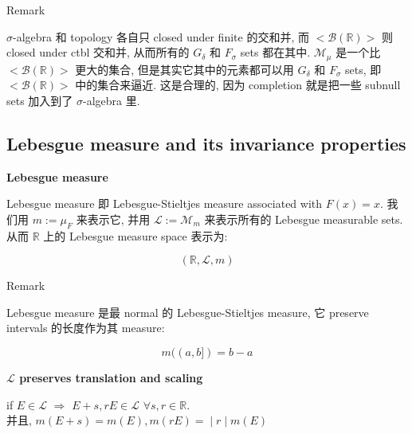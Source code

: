 \documentclass{qlnotes-export}
\begin{document}
\begin{qlremark}{Remark}

\(\sigma\)-algebra 和 topology 各自只 closed under finite 的交和并, 而 \(< \mathcal{B}({\mathbb{R}}) >\) 则 closed under ctbl 交和并, 从而所有的 \(G_{\delta}\) 和 \(F_{\sigma}\) sets 都在其中. \(\mathcal{M}_{\mu}\) 是一个比 \(< \mathcal{B}({\mathbb{R}}) >\) 更大的集合, 但是其实它其中的元素都可以用 \(G_{\delta}\) 和 \(F_{\sigma}\) sets, 即 \(< \mathcal{B}({\mathbb{R}}) >\) 中的集合来逼近. 这是合理的, 因为 completion 就是把一些 subnull sets 加入到了 \(\sigma\)-algebra 里.

\end{qlremark}

\subsection{Lebesgue measure and its invariance properties}\label{lebesgue-measure-and-its-invariance-properties}

\begin{definition}{\protect{}\label{kn-lebesgue-measure}{\textbf{Lebesgue
measure}}}

Lebesgue measure 即 Lebesgue-Stieltjes measure associated with \(F(x) = x\). 我们用 \(m := \mu_{F}\) 来表示它, 并用 \(\mathcal{L} := \mathcal{M}_{m}\) 来表示所有的 Lebesgue measurable sets.\\
从而 \(\mathbb{R}\) 上的 Lebesgue measure space 表示为:

\[({\mathbb{R}},\mathcal{L},m)\]

\end{definition}

\begin{qlremark}{Remark}

Lebesgue measure 是最 normal 的 Lebesgue-Stieltjes measure, 它 preserve intervals 的长度作为其 measure:

\[m((a,b\rbrack) = b - a\]

\end{qlremark}

\begin{theorem}{\protect{}\label{kn-mathcal-l-preserves-translation-and-scaling}{\textbf{\(\mathcal{L}\)
preserves translation and scaling}}}

if \(E \in \mathcal{L}\) \(\Rightarrow\) \(E + s,rE \in \mathcal{L}\) \(\forall s,r \in {\mathbb{R}}\).\\
并且, \(\left. m(E + s) = m(E),m(rE) = \middle| r \middle| m(E) \right.\)

\end{theorem}
\end{document}
